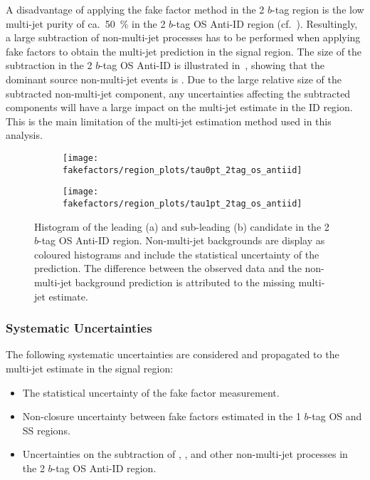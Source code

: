 A disadvantage of applying the fake factor method in the 2 $b$-tag
region is the low multi-jet purity of ca.\ \SI{50}{\percent} in the 2
$b$-tag OS Anti-ID region (cf.\
). Resultingly, a large subtraction of
non-multi-jet processes has to be performed when applying fake factors
to obtain the multi-jet prediction in the signal region.  The size of
the subtraction in the 2 $b$-tag OS Anti-ID is illustrated
in~, showing that the dominant source
non-multi-jet events is \ttbarFakes. Due to the large relative size of
the subtracted non-multi-jet component, any uncertainties affecting
the subtracted components will have a large impact on the multi-jet
estimate in the ID region. This is the main limitation of the
multi-jet estimation method used in this analysis.

\begin{figure}[htbp]
  \centering

  \begin{subfigure}{0.49\textwidth}
    \texttt{[image: fakefactors/region\_plots/tau0pt\_2tag\_os\_antiid]}
    \subcaption{}
  \end{subfigure}
  \begin{subfigure}{0.49\textwidth}
    \texttt{[image: fakefactors/region\_plots/tau1pt\_2tag\_os\_antiid]}
    \subcaption{}
  \end{subfigure}

  \caption{Histogram of the leading (a) and sub-leading (b) \tauhadvis
    candidate \pT in the 2 $b$-tag OS Anti-ID region. Non-multi-jet
    backgrounds are display as coloured histograms and include the
    statistical uncertainty of the prediction. The difference between
    the observed data and the non-multi-jet background prediction is
    attributed to the missing multi-jet estimate.}
  \label{fig:mjfakes_2tag_os_antiid}
\end{figure}


\subsubsection{Systematic Uncertainties}

The following systematic uncertainties are considered and propagated
to the multi-jet estimate in the \hadhad signal region:
\begin{itemize}
\item The statistical uncertainty of the fake factor measurement.
\item Non-closure uncertainty between fake factors estimated in the 1
  $b$-tag OS and SS regions.
\item Uncertainties on the subtraction of \ttbar, \ttbarFakes, and
  other non-multi-jet processes in the 2 $b$-tag OS Anti-ID region.
\end{itemize}

